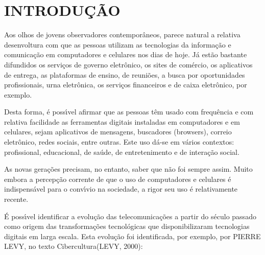 \documentclass[
12pt,		%
openright,	%
twoside,  %
a4paper,			%
chapter=TITLE,		%
english,			%
french,				%
spanish,			%
brazil				%
]{USPSC-classe/USPSC}
\begin{document}
\chapter[INTRODU\c{C}\~AO]{INTRODU\c{C}\~AO}\label{INTRODU\c{C}\~AO}
Aos olhos de jovens observadores contempor\^aneos, parece natural a relativa desenvoltura com que as pessoas utilizam  as tecnologias da informa\c{c}\~ao e comunica\c{c}\~ao em computadores e celulares nos dias de hoje. J\'a est\~ao bastante difundidos os servi\c{c}os de governo eletr\^onico, os sites de com\'ercio, os  aplicativos de entrega, as plataformas de ensino, de reuni\~oes, a busca por oportunidades profissionais, urna eletr\^onica, os servi\c{c}os financeiros e de caixa eletr\^onico, por exemplo.









Desta forma, \'e poss\'{\i}vel afirmar que as pessoas t\^em usado com frequ\^encia e com relativa facilidade as ferramentas digitais instaladas em computadores e em celulares, sejam aplicativos de mensagens, buscadores (browsers), correio eletr\^onico, redes sociais, entre outras. Este uso d\'a-se em v\'arios contextos: profissional, educacional, de sa\'ude,  de entretenimento e de intera\c{c}\~ao social.









As novas gera\c{c}\~oes precisam, no entanto, saber que n\~ao foi sempre assim. Muito embora a percep\c{c}\~ao corrente de que o uso de computadores e celulares \'e indispens\'avel para o conv\'{\i}vio na sociedade, a rigor seu uso \'e relativamente recente.









\'E poss\'{\i}vel identificar a evolu\c{c}\~ao das telecomunica\c{c}\~oes a partir do s\'eculo passado como origem das transforma\c{c}\~oes tecnol\'ogicas que disponibilizaram tecnologias digitais em larga escala. Esta evolu\c{c}\~ao foi identificada, por exemplo, por PIERRE LEVY, no texto \textquotedbl Cibercultura\textquotedbl  (LEVY, 2000):
\end{document}
